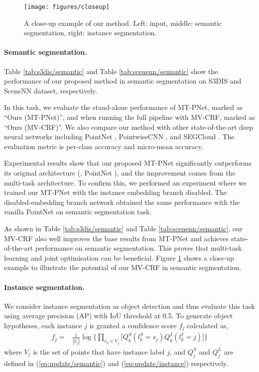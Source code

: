 \documentclass[10pt,twocolumn,letterpaper]{article}
\begin{document}
\begin{figure}[h!t]
  \centering
  \texttt{[image: figures/closeup]}
  \caption{A close-up example of our method. Left: input, middle: semantic
    segmentation, right: instance segmentation.}
  \label{fig:closeup}
\end{figure}

\paragraph{Semantic segmentation.}
Table \ref{tab:s3dis/semantic} and Table \ref{tab:scenenn/semantic} show the
performance of our proposed method in semantic segmentation on S3DIS and SceneNN
dataset, respectively.

In this task, we evaluate the stand-alone performance of MT-PNet, marked as
``Ours (MT-PNet)'', and when running the full pipeline with MV-CRF, marked as
``Ours (MV-CRF)''. We also compare our method with other state-of-the-art deep
neural networks including PointNet \cite{qi-pointnet-cvpr17}, PointwiseCNN
\cite{hua-pointwise-cvpr18}, and SEGCloud \cite{tchapmi-segcloud-3dv17}. The
evaluation metric is per-class accuracy and micro-mean accuracy.

Experimental results show that our proposed MT-PNet significantly outperforms
its original architecture (\ie, PointNet \cite{qi-pointnet-cvpr17}), and the
improvement comes from the multi-task architecture. To confirm this, we
performed an experiment where we trained our MT-PNet with the instance embedding
branch disabled. The disabled-embedding branch network obtained the same
performance with the vanilla PointNet on semantic segmentation task.

As shown in Table \ref{tab:s3dis/semantic} and Table \ref{tab:scenenn/semantic},
our MV-CRF also well improves the base results from MT-PNet and achieves
state-of-the-art performance on semantic segmentation. This proves that
multi-task learning and joint optimisation can be beneficial. Figure
\ref{fig:closeup} shows a close-up example to illustrate the potential of our
MV-CRF in semantic segmentation.

\paragraph{Instance segmentation.}

We consider instance segmentation as object detection and thus evaluate this
task using average precision (AP) with IoU threshold at 0.5. To generate object
hypotheses, each instance $j$ is granted a confidence score $f_j$ calculated as,
\begin{align}
  \label{eq:confidence}
  f_j = &\frac{1}{\left | V_j \right |} \log \bigg\{ \prod_{v_k \in V_j} \bigg[ Q_k^S(l_k^S=s_j)Q_k^I(l_k^I=j) \bigg] \bigg\}
\end{align}
where $V_j$ is the set of points that have instance label $j$, and $Q_j^S$ and
$Q_j^L$ are defined in (\ref{eq:update/semantic}) and (\ref{eq:update/instance})
respectively.
\end{document}
